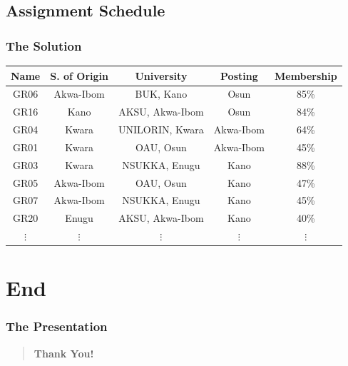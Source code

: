 \documentclass[10pt]{beamer}
\begin{document}
			\subsection{Assignment Schedule}
			\begin{frame}
				\frametitle{The Solution}				
				\begin{center}
					\begin{tabular}{|c|c|c|c|c|}
						\hline
							\textbf{Name} & \textbf{S. of Origin} & \textbf{University} & \textbf{Posting} & \textbf{Membership} \\
							\hline
							GR06 & Akwa-Ibom & BUK, Kano & Osun & 85\% \\
							\hline
							GR16 & Kano & AKSU, Akwa-Ibom & Osun & 84\% \\
							\hline
							GR04 & Kwara & UNILORIN, Kwara & Akwa-Ibom & 64\% \\
							\hline
							GR01 & Kwara & OAU, Osun & Akwa-Ibom & 45\% \\
							\hline
							GR03 & Kwara & NSUKKA, Enugu & Kano & 88\% \\
							\hline
							GR05 & Akwa-Ibom & OAU, Osun & Kano & 47\% \\
							\hline
							GR07 & Akwa-Ibom & NSUKKA, Enugu & Kano & 45\% \\
							\hline
							GR20 & Enugu & AKSU, Akwa-Ibom & Kano & 40\% \\
							\hline
							$\vdots$ & $\vdots$ & $\vdots$ & $\vdots$ & $\vdots$ \\
							\hline
					\end{tabular}		
				\end{center}
			\end{frame}
			
			\section{End}
			\begin{frame}
				\frametitle{The Presentation}	
				\begin{center}			
					\begin{quote}
						\centering \textbf{Thank You!}
					\end{quote}					
				\end{center}
			\end{frame}


\end{document}
